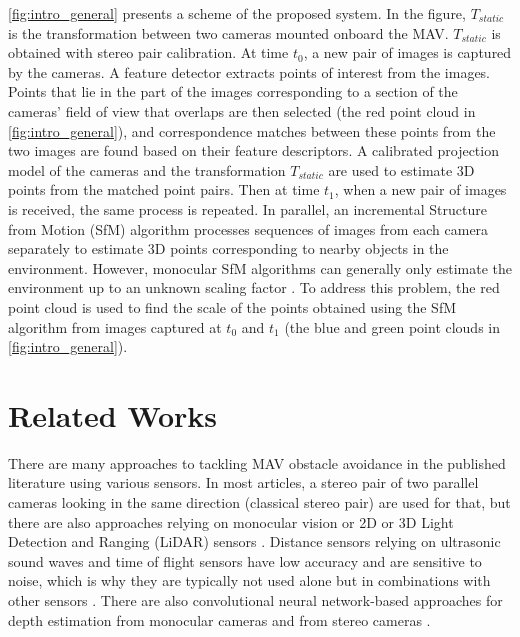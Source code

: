 \autoref{fig:intro_general} presents a scheme of the proposed system.
In the figure, $T_{static}$ is the transformation between two cameras mounted onboard the MAV.
$T_{static}$ is obtained with stereo pair calibration. 
At time $t_0$, a new pair of images is captured by the cameras.
A feature detector extracts points of interest from the images.
Points that lie in the part of the images corresponding to a section of the cameras' field of view that overlaps are then selected (the red point cloud in \autoref{fig:intro_general}), and correspondence matches between these points from the two images are found based on their feature descriptors.
A calibrated projection model of the cameras and the transformation $T_{static}$ are used to estimate 3D points from the matched point pairs.
Then at time $t_1$, when a new pair of images is received, the same process is repeated. 
In parallel, an incremental Structure from Motion (SfM) algorithm processes sequences of images from each camera separately to estimate 3D points corresponding to nearby objects in the environment. However, monocular SfM algorithms can generally only estimate the environment up to an unknown scaling factor \cite{SfM}. To address this problem, the red point cloud is used to find the scale of the points obtained using the SfM algorithm from images captured at $t_0$ and $t_1$ (the blue and green point clouds in \autoref{fig:intro_general}).

\section{Related Works}

There are many approaches to tackling MAV obstacle avoidance in the published literature using various sensors.
In most articles, a stereo pair of two parallel cameras looking in the same direction (classical stereo pair) \cite{Lin2021,Ruf2018,Oleinikova2015,Back2020} are used for that, but there are also approaches relying on monocular vision \cite{Mejias2010,Zhang2019,Bills2011} or 2D or 3D Light Detection and Ranging (LiDAR) sensors \cite{Ramasamy2016}.
Distance sensors relying on ultrasonic sound waves and time of flight sensors have low accuracy and are sensitive to noise, which is why they are typically not used alone but in combinations with other sensors \cite{Gageik2015,Nor2017}. 
There are also convolutional neural network-based approaches for depth estimation from monocular cameras \cite{Zhang2019,Yu2013, Park2020} and from stereo cameras \cite{Back2020}.



